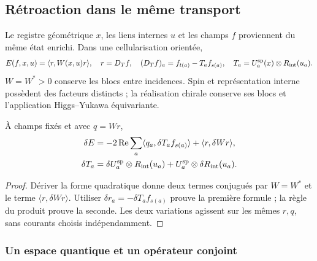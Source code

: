 \subsection{Rétroaction dans le même transport}
\label{hmtcuatro:gea:retroaccion}

Le registre géométrique $x$, les liens internes $u$ et les champs $f$ proviennent du même état enrichi. Dans une cellularisation orientée,
\begin{equation}
E(f,x,u)=\langle r,W(x,u)r\rangle,\quad r=D_Tf,\quad
(D_Tf)_a=f_{t(a)}-T_af_{s(a)},\quad
T_a=U_a^{\rm sp}(x)\otimes R_{\rm int}(u_a).
\label{hmtcuatro:gea:energia-memoria}
\end{equation}
$W=W^*>0$ conserve les blocs entre incidences. Spin et représentation interne possèdent des facteurs distincts ; la réalisation chirale conserve ses blocs et l’application Higgs--Yukawa équivariante.

\begin{proposition}
\label{hmtcuatro:gea:variacion} À champs fixés et avec $q=Wr$,
\begin{align}
\delta E&=-2\operatorname{Re}\sum_a
\langle q_a,\delta T_af_{s(a)}\rangle+\langle r,\delta Wr\rangle,
\label{hmtcuatro:gea:diferencial}\\
\delta T_a&=\delta U_a^{\rm sp}\otimes R_{\rm int}(u_a)
+U_a^{\rm sp}\otimes\delta R_{\rm int}(u_a).\nonumber
\end{align}
\end{proposition}
\begin{proof}
Dériver la forme quadratique donne deux termes conjugués par $W=W^*$ et le terme $\langle r,\delta Wr\rangle$. Utiliser $\delta r_a=-\delta T_af_{s(a)}$ prouve la première formule ; la règle du produit prouve la seconde. Les deux variations agissent sur les mêmes $r,q$, sans courants choisis indépendamment.
\end{proof}

\subsubsection{Un espace quantique et un opérateur conjoint}
\label{hmtcuatro:gea:cuantica}

